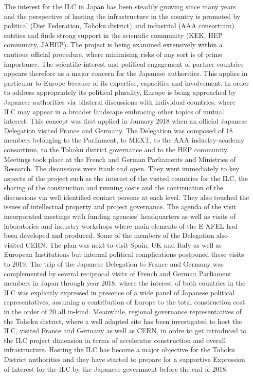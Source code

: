 \documentclass[%
 reprint,
 amsmath,amssymb,
 aps,
]{revtex4-1}
\begin{document}
The interest for the ILC in Japan has been steadily growing since many years and the perspective
of hosting the infrastructure in the country is promoted by political (Diet Federation, Tohoku district)
and industrial (AAA consortium) entities and finds strong support in the scientific community (KEK,
HEP community, JAHEP). The project is being examined extensively within a cautious official procedure, 
where minimising risks of any sort is of prime importance. The scientific interest and political
engagement of partner countries appears therefore as a major concern for the Japanese authorities. This
applies in particular to Europe because of its expertise, capacities and involvement.
In order to address appropriately its political plurality, Europe is being approached by Japanese
authorities via bilateral discussions with individual countries, where ILC may appear in a broader
landscape embracing other topics of mutual interest. This concept was first applied in January 2018
when an official Japanese Delegation visited France and Germany. The Delegation was composed of
18 members belonging to the Parliament, to MEXT, to the AAA industry-academy consortium, to the
Tohoku district governance and to the HEP community. Meetings took place at the French and German
Parliaments and Ministries of Research. The discussions were frank and open. They went immediately
to key aspects of the project such as the interest of the visited countries for the ILC, the sharing of the
construction and running costs and the continuation of the discussions via well identified contact persons
at each level. They also touched the issues of intellectual property and project governance. The agenda
of the visit incorporated meetings with funding agencies' headquarters as well as visits of laboratories
and industry workshops where main elements of the E-XFEL had been developed and produced. Some
of the members of the Delegation also visited CERN. The plan was next to visit Spain, UK and Italy
as well as European Institutions but internal political complications postponed these visits to 2019.
The trip of the Japanese Delegation to France and Germany was complemented by several reciprocal
visits of French and German Parliament members in Japan through year 2018, where the interest of
both countries in the ILC was explicitly expressed in presence of a wide panel of Japanese political
representatives, assuming a contribution of Europe to the total construction cost in the order of 20 %
all in-kind. Meanwhile, regional governance representatives of the Tohoku district, where a well adapted
site has been investigated to host the ILC, visited France and Germany as well as CERN, in ordre to get
introduced to the ILC project dimension in terms of accelerator construction and overall infrastructure.
Hosting the ILC has become a major objective for the Tohoku District authorities and they have started
to prepare for a supportive Expression of Interest for the ILC by the Japanese government before the
end of 2018.
\end{document}

